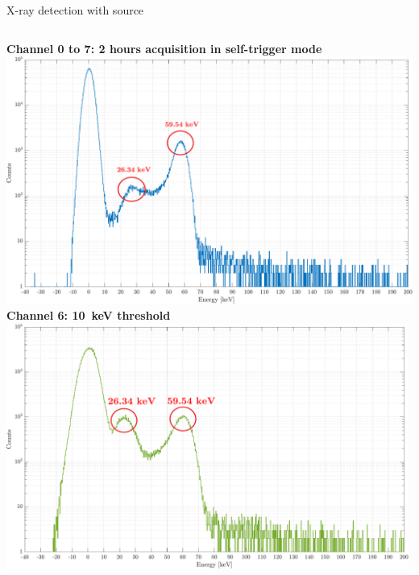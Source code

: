 \documentclass[aspectratio=169,xcolor=dvipsnamesz]{beamer} %
\begin{document}

\begin{frame}{X-ray detection with  source}
    \addtolength{\leftmargini}{\labelsep}
    \fontsize{9pt}{1}\selectfont
    \vspace{0.1cm}
    \begin{columns}
            \centering
            \textbf{\hspace{0.7cm}Channel 0 to 7: 2 hours acquisition in self-trigger mode}
            \vskip0.1cm
            \includegraphics[width=1.06\textwidth]{images/muon_detection/americium/ch4_americio_log.pdf}
            \centering
            \fontsize{8.5pt}{1}\selectfont
            \textbf{Channel 6: \SI{10}{\kilo\electronvolt} threshold}
            \vskip0.1cm
            \includegraphics[width=0.99\textwidth]{images/muon_detection/americium/ch4_americio_log_ch6.pdf}

\end{columns}
\end{frame}
\end{document}

